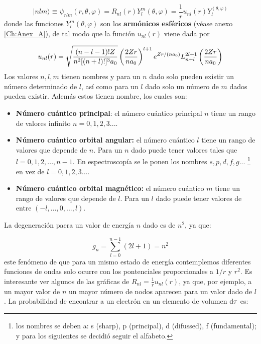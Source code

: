 \begin{equation}
|n l m \rangle \equiv \psi_{rlm} (r,\theta,\varphi) = R_{nl} (r) Y_l^m (\theta,\varphi) = \frac{1}{r} u_{nl} (r) Y_l^ (\theta,\varphi)
\end{equation}
donde las funciones $Y_l^m (\theta,\varphi)$ son los \textbf{armónicos esféricos} (véase anexo \ref{Ch:Anex_A}), de tal modo que la función $u_{nl} (r)$ viene dada por

\begin{equation}
    u_{nl} (r) = \sqrt{\frac{(n-l-1)! Z}{n^2 [(n+l)!]^3a_0}} \left( \frac{2Zr}{na_0} \right)^{l+1} e^{Zr/(na_0)} L_{n+l}^{2l+1} \left( \frac{2Zr}{na_0} \right)
\end{equation}
Los valores $n,l,m$ tienen nombres y para un $n$ dado solo pueden existir un número determinado de $l$, así como para un $l$ dado solo un número de $m$ dados pueden existir. Además estos tienen nombre, los cuales son:

\begin{itemize}
    \item \textbf{Número cuántico principal}: el número cuántico principal $n$ tiene un rango de valores infinito $n=0,1,2,3...$. 
    \item \textbf{Número cuántico orbital angular:} el número cuántico $l$ tiene un rango de valores que depende de $n$. Para un $n$ dado puede tener valores tales que $l=0,1,2,...,n-1$. En espectroscopía se le ponen los nombres $s,p,d,f,g...$ \footnote{los nombres se deben a: s (sharp), p (principal), d (difussed), f (fundamental); y para los siguientes se decidió seguir el alfabeto.} en vez de $l=0,1,2,3...$.
    \item \textbf{Número cuántico orbital magnético:} el número cuántico $m$ tiene un rango de valores que depende de $l$. Para un $l$ dado puede tener valores de entre $(-l,...,0,...,l)$.
\end{itemize}
La degeneración paera un valor de energía $n$ dado es de $n^2$, ya que:

\begin{equation}    
    g_n = \sum_{l=0}^{n-1} (2l+1) = n^2
\end{equation}
este fenómeno de que para un mismo estado de energía contemplemos diferentes funciones de ondas solo ocurre con los pontenciales proporcionales a $1/r$ y $r^2$. Es interesante ver algunos de las gráficas de $R_{nl} = \frac{1}{r} u_{nl} (r)$, ya que, por ejemplo, a un mayor valor de $n$ un mayor número de nodos aparecen para un valor dado de $l$. La probabilidad de encontrar a un electrón en un elemento de volumen $\mathrm{d} \tau$ es:



